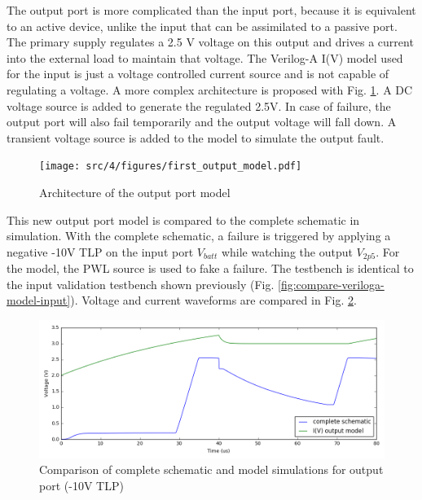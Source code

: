 The output port is more complicated than the input port, because it is equivalent to an active device, unlike the input that can be assimilated to a passive port.
The primary supply regulates a 2.5 V voltage on this output and drives a current into the external load to maintain that voltage.
The Verilog-A I(V) model used for the input is just a voltage controlled current source and is not capable of regulating a voltage.
A more complex architecture is proposed with Fig. \ref{fig:first-output-model}.
A DC voltage source is added to generate the regulated 2.5V.
In case of failure, the output port will also fail temporarily and the output voltage will fall down.
A transient voltage source is added to the model to simulate the output fault.

\begin{figure}[!h]
  \centering
  \texttt{[image: src/4/figures/first\_output\_model.pdf]}
  \caption{Architecture of the output port model}
  \label{fig:first-output-model}
\end{figure}

This new output port model is compared to the complete schematic in simulation.
With the complete schematic, a failure is triggered by applying a negative -10V TLP on the input port $V_{batt}$ while watching the output $V_{2p5}$.
For the model, the PWL source is used to fake a failure.
The testbench is identical to the input validation testbench shown previously (Fig. \ref{fig:compare-veriloga-model-input}).
Voltage and current waveforms are compared in Fig. \ref{fig:compare-model-simu-m10-output}.

\begin{figure}[!h]
  \centering
  \includegraphics[width=\textwidth]{src/4/figures/comparison_model_total_output_bad_m10V.png}
  \caption{Comparison of complete schematic and model simulations for output port (-10V TLP)}
  \label{fig:compare-model-simu-m10-output}
\end{figure}

